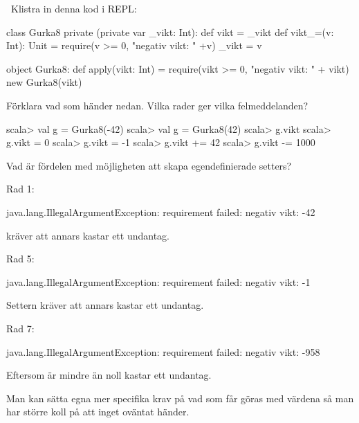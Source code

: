 \QUESTBEGIN

\Task  \what~Klistra in denna kod i REPL:

\begin{Code}
class Gurka8 private (private var _vikt: Int):
  def vikt = _vikt
  def vikt_=(v: Int): Unit =
    require(v >= 0, "negativ vikt: " +v)
    _vikt = v

object Gurka8:
  def apply(vikt: Int) =
    require(vikt >= 0, "negativ vikt: " + vikt)
    new Gurka8(vikt)
\end{Code}


\Subtask Förklara vad som händer nedan. Vilka rader ger vilka felmeddelanden?
\begin{REPL}
scala> val g = Gurka8(-42)
scala> val g = Gurka8(42)
scala> g.vikt
scala> g.vikt = 0
scala> g.vikt = -1
scala> g.vikt += 42
scala> g.vikt -= 1000
\end{REPL}

\Subtask Vad är fördelen med möjligheten att skapa egendefinierade setters?

\SOLUTION


\TaskSolved \what


\SubtaskSolved

Rad 1:
\begin{REPL}
	java.lang.IllegalArgumentException: requirement failed: negativ vikt: -42
\end{REPL}
 kräver att  annars kastar  ett undantag.

Rad 5:
\begin{REPL}
	java.lang.IllegalArgumentException: requirement failed: negativ vikt: -1
\end{REPL}
Settern  kräver att  annars kastar  ett undantag.

Rad 7:
\begin{REPL}
	java.lang.IllegalArgumentException: requirement failed: negativ vikt: -958
\end{REPL}
Eftersom  är mindre än noll kastar  ett undantag.

\SubtaskSolved  Man kan sätta egna mer specifika krav på vad som får göras med värdena så man har större koll på att inget oväntat händer.

\QUESTEND





\QUESTBEGIN

